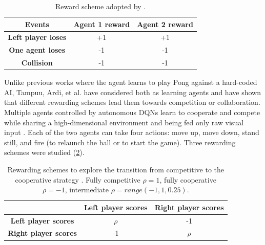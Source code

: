 \begin{table}[ht]
  \renewcommand{\arraystretch}{1.3}
  \caption{Reward scheme adopted by \cite{diallo2017learning}.}
  \label{tab:reward-scheme}
  \centering
  \begin{tabular}{@{}ccc@{}}
    \toprule
    \textbf{Events}            & \textbf{Agent 1 reward} & \textbf{Agent 2 reward} \\ \midrule
    \textbf{Left player loses} & +1                      & +1                      \\
    \textbf{One agent loses}   & -1                      & -1                      \\
    \textbf{Collision}         & -1                      & -1                      \\ \bottomrule
  \end{tabular}
\end{table}

Unlike previous works where the agent learns to play Pong against a hard-coded AI, 
Tampuu, Ardi, et al. \cite{tampuu2017multiagent} have considered both as learning agents and have shown that different rewarding schemes lead them towards competition or collaboration.
%
Multiple agents controlled by autonomous DQNs learn to cooperate and compete while sharing a high-dimensional environment and being fed only raw visual input \cite{tampuu2017multiagent}.
%
Each of the two agents can take four actions: 
move up, move down, stand still, and fire (to relaunch the ball or to start the game).
%
Three rewarding schemes were studied (\cref{tab:reward-scheme-2}).
%
\begin{table}[ht]
  \renewcommand{\arraystretch}{1.3}
  \caption{Rewarding schemes to explore the transition from competitive to the cooperative strategy \cite{tampuu2017multiagent}. Fully competitive $\rho = 1$, fully cooperative $\rho = -1$, intermediate $\rho = range(-1, 1, 0.25)$.}
  \label{tab:reward-scheme-2}
  \centering
  \begin{tabular}{@{}ccc@{}}
    \toprule
                                                   & \textbf{Left player scores} & \textbf{Right player scores} \\ \midrule
    \multicolumn{1}{c}{\textbf{Left player scores}} & $\rho$                   & -1                       \\ 
    \multicolumn{1}{c}{\textbf{Right player scores}} & -1                       & $\rho$                   \\ \bottomrule
  \end{tabular}
\end{table}

